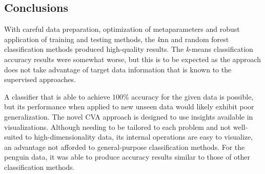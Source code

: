\documentclass[12pt]{article}
\begin{document}
\subsection*{Conclusions}

With careful data preparation, optimization of metaparameters and robust application of training and testing methods, 
the \textit{k}nn and random forest classification methods produced high-quality results. 
The \textit{k}-means classification accuracy results were somewhat worse, 
but this is to be expected as the approach does not take advantage of target data information that is known to the supervised approaches. 

A classifier that is able to achieve 100\% accuracy for the given data is possible, 
but its performance when applied to new unseen data would likely exhibit poor generalization.
The novel CVA approach is designed to use insights available in visualizations. 
Although needing to be tailored to each problem and not well-suited to high-dimensionality data, 
its internal operations are easy to visualize, an advantage not afforded to general-purpose classification methods. 
For the penguin data, it was able to produce accuracy results similar to those of other classification methods. 

\printbibliography
\end{document}

